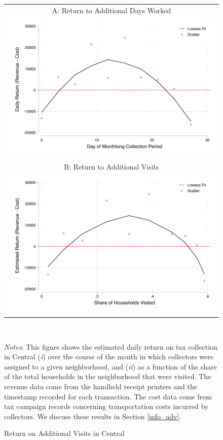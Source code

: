 \documentclass[12pt,english]{article}
\renewcommand{\footnotesize}{\fontsize{9pt}{11pt}\selectfont}\usepackage[unicode=true,
\begin{document}
\begin{figure}[H]
\vspace{.5cm}
\caption{Return on Additional Visits in Central
\label{return_by_day}}
\begin{center}
\begin{tabular}{c}
A: Return to Additional Days Worked \\
\includegraphics[scale=.75]{Output/return_by_day_central_month1-2_bin.pdf} \\
B: Return to Additional Visits \\
\includegraphics[scale=.75]{Output/return_by_visits_central_month1-2_bin.pdf}\end{tabular}
\end{center}
\usebox{\tablebox}\\[1ex]
\parbox{6in}{\footnotesize \textit{Notes}: This figure shows the estimated daily return on tax collection in Central (\textit{i}) over the course of the month in which collectors were assigned to a given neighborhood, and (\textit{ii}) as a function of the share of the total households in the neighborhood that were visited. The revenue data come from the handheld receipt printers and the timestamp recorded for each transaction. The cost data come from tax campaign records concerning transportation costs incurred by collectors. We discuss these results in Section \ref{info_adv}.}
\vspace{.5cm}
\end{figure}
\end{document}

